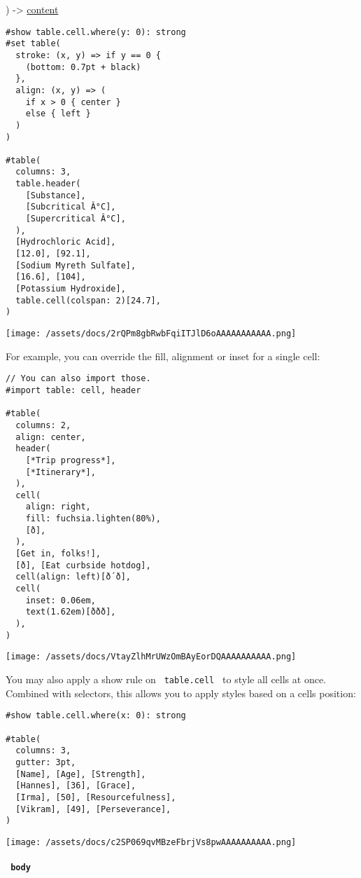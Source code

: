 ) -\textgreater{} \href{/docs/reference/foundations/content/}{content}

\begin{verbatim}
#show table.cell.where(y: 0): strong
#set table(
  stroke: (x, y) => if y == 0 {
    (bottom: 0.7pt + black)
  },
  align: (x, y) => (
    if x > 0 { center }
    else { left }
  )
)

#table(
  columns: 3,
  table.header(
    [Substance],
    [Subcritical Â°C],
    [Supercritical Â°C],
  ),
  [Hydrochloric Acid],
  [12.0], [92.1],
  [Sodium Myreth Sulfate],
  [16.6], [104],
  [Potassium Hydroxide],
  table.cell(colspan: 2)[24.7],
)
\end{verbatim}

\texttt{[image: /assets/docs/2rQPm8gbRwbFqiITJlD6oAAAAAAAAAAA.png]}

For example, you can override the fill, alignment or inset for a single
cell:

\begin{verbatim}
// You can also import those.
#import table: cell, header

#table(
  columns: 2,
  align: center,
  header(
    [*Trip progress*],
    [*Itinerary*],
  ),
  cell(
    align: right,
    fill: fuchsia.lighten(80%),
    [ð],
  ),
  [Get in, folks!],
  [ð], [Eat curbside hotdog],
  cell(align: left)[ð´ð],
  cell(
    inset: 0.06em,
    text(1.62em)[ððð],
  ),
)
\end{verbatim}

\texttt{[image: /assets/docs/VtayZlhMrUWzOmBAyEorDQAAAAAAAAAA.png]}

You may also apply a show rule on \texttt{\ table.cell\ } to style all
cells at once. Combined with selectors, this allows you to apply styles
based on a cell\textquotesingle s position:

\begin{verbatim}
#show table.cell.where(x: 0): strong

#table(
  columns: 3,
  gutter: 3pt,
  [Name], [Age], [Strength],
  [Hannes], [36], [Grace],
  [Irma], [50], [Resourcefulness],
  [Vikram], [49], [Perseverance],
)
\end{verbatim}

\texttt{[image: /assets/docs/c2SP069qvMBzeFbrjVs8pwAAAAAAAAAA.png]}

\paragraph{\texorpdfstring{\texttt{\ body\ }}{ body }}\label{definitions-cell-body}

